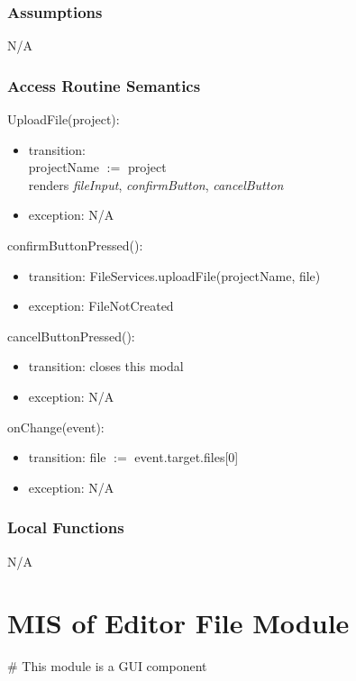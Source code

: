 \documentclass[12pt, titlepage]{article}
\begin{document}
	\subsubsection{Assumptions}
	N/A
	
	\subsubsection{Access Routine Semantics}
	
	\noindent UploadFile(project):
	\begin{itemize}
		\item transition:\\
		projectName $:=$ project \\
		renders \textit{fileInput}, \textit{confirmButton}, \textit{cancelButton}
		\item exception: N/A
	\end{itemize}
	
	\noindent confirmButtonPressed():
	\begin{itemize}
		\item transition: FileServices.uploadFile(projectName, file)\\
		\item exception: FileNotCreated
	\end{itemize}
	
	\noindent cancelButtonPressed():
	\begin{itemize}
		\item transition: closes this modal
		\item exception: N/A
	\end{itemize}
	
	\noindent onChange(event):
	\begin{itemize}
		\item transition: file $:=$ event.target.files[0]
		\item exception: N/A
	\end{itemize}
	
	\subsubsection{Local Functions}
	
	N/A
	
	
	\newpage
	
	
	\section{MIS of Editor File Module} \label{Module} 
	\# This module is a GUI component
\end{document}
